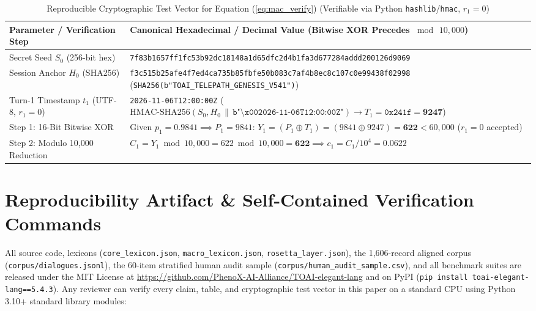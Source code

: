 \documentclass[9pt,a4paper]{extarticle}
\begin{document}
\begin{table}[h!]
\centering
\caption{Reproducible Cryptographic Test Vector for Equation (\ref{eq:mac_verify}) (Verifiable via Python \texttt{hashlib}/\texttt{hmac}, $r_1 = 0$)}
\label{tab:crypto_vector}
\footnotesize
\renewcommand{\arraystretch}{1.08}
\begin{tabularx}{\textwidth}{L{3.7cm} Y}
\toprule
{}
\textbf{\color{white}Parameter / Verification Step} &
\textbf{\color{white}Canonical Hexadecimal / Decimal Value (Bitwise XOR Precedes $\bmod\, 10{,}000$)} \\
\midrule
Secret Seed $S_0$ (256-bit hex) & \texttt{7f83b1657ff1fc53b92dc18148a1d65dfc2d4b1fa3d677284addd200126d9069} \\
Session Anchor $H_0$ (SHA256) & \texttt{f3c515b25afe4f7ed4ca735b85fbfe50b083c7af4b8ec8c107c0e99438f02998} (\texttt{SHA256(b"TOAI\_TELEPATH\_GENESIS\_V541")}) \\
Turn-1 Timestamp $t_1$ (UTF-8, $r_1=0$) & \texttt{2026-11-06T12:00:00Z} ($\text{HMAC-SHA256}(S_0, H_0 \,\|\, \texttt{b"\textbackslash x002026-11-06T12:00:00Z"}) \rightarrow T_1 = \texttt{0x241f} = \mathbf{9247}$) \\
Step 1: 16-Bit Bitwise XOR & Given $p_1 = 0.9841 \implies P_1 = 9841$: $Y_1 = (P_1 \oplus T_1) = (9841 \oplus 9247) = \mathbf{622} < 60{,}000$ ($r_1 = 0$ accepted) \\
Step 2: Modulo 10,000 Reduction & $C_1 = Y_1 \bmod 10{,}000 = 622 \bmod 10{,}000 = \mathbf{622} \implies c_1 = C_1 / 10^4 = \mathbf{0.0622}$ \\
\bottomrule
\end{tabularx}
\end{table}

\section{Reproducibility Artifact \& Self-Contained Verification Commands}
All source code, lexicons (\texttt{core\_lexicon.json}, \texttt{macro\_lexicon.json}, \texttt{rosetta\_layer.json}), the 1,606-record aligned corpus (\texttt{corpus/dialogues.jsonl}), the 60-item stratified human audit sample (\texttt{corpus/human\_audit\_sample.csv}), and all benchmark suites are released under the MIT License at \url{https://github.com/PhenoX-AI-Alliance/TOAI-elegant-lang} and on PyPI (\texttt{pip install toai-elegant-lang==5.4.3}). Any reviewer can verify every claim, table, and cryptographic test vector in this paper on a standard CPU using Python 3.10+ standard library modules:
\end{document}
